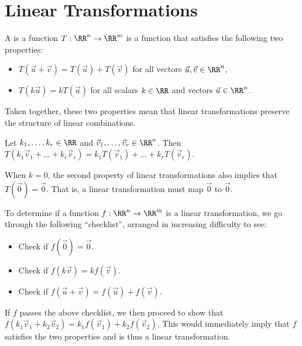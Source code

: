 \chapter{Linear Transformations}

\begin{definition}
    A  is a function $T : \RR^n \to \RR^m$ is a function that satisfies the following two properties:
    \begin{itemize}
        \item $T(\vec u + \vec v) = T(\vec u) + T(\vec v)$ for all vectors $\vec u, \vec v \in \RR^n$,
        \item $T(k \vec u) = k T(\vec u)$ for all scalars $k \in \RR$ and vectors $\vec u \in \RR^n$.
    \end{itemize}
\end{definition}

Taken together, these two properties mean that linear transformations preserve the structure of linear combinations.

\begin{proposition}
    Let $k_1, \dots, k_r \in \RR$ and $\vec v_1, \dots, \vec v_r \in \RR^n$. Then $T(k_1 \vec v_1 + \dots + k_r \vec v_r) = k_1 T(\vec v_1) + \dots + k_r T(\vec v_r)$.
\end{proposition}

When $k = 0$, the second property of linear transformations also implies that $T(\vec 0) = \vec 0$. That is, a linear transformation must map $\vec 0$ to $\vec 0$.

\begin{recipe}
    To determine if a function $f : \RR^n \to \RR^m$ is a linear transformation, we go through the following ``checklist'', arranged in increasing difficulty to see:
    \begin{itemize}
        \item Check if $f(\vec 0) = \vec 0$.
        \item Check if $f(k \vec v) = k f(\vec v)$.
        \item Check if $f(\vec u + \vec v) = f(\vec u) + f(\vec v)$.
    \end{itemize}
    If $f$ passes the above checklist, we then proceed to show that $f(k_1 \vec v_1 + k_2 \vec v_2) = k_1 f(\vec v_1) + k_2 f(\vec v_2)$. This would immediately imply that $f$ satisfies the two properties and is thus a linear transformation.
\end{recipe}

